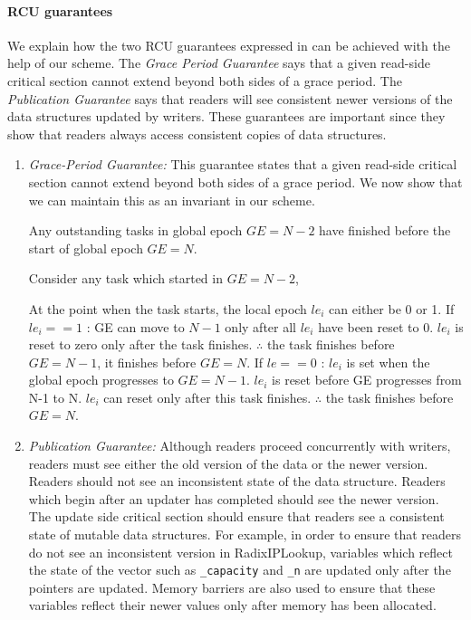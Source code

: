 \documentclass[a4paper]{article}
\newcommand{\INDSTATE}[1][1]{\STATE\hspace{#1\algorithmicindent}}
\begin{document}
\paragraph{RCU guarantees} 
We explain how the two RCU guarantees expressed in \cite{urcu} can be achieved with the help of our scheme. The \emph{Grace Period Guarantee} says that a given read-side critical section cannot extend beyond both sides of a grace period. The \emph{Publication Guarantee} says that readers will see consistent newer versions of the data structures updated by writers. These guarantees are important since they show that readers always access consistent copies of data structures. 
\begin{enumerate}
\item \emph{Grace-Period Guarantee:} This guarantee states that a given read-side critical section cannot extend beyond both sides of a grace period. We now show that we can maintain this as an invariant in our scheme.

\begin{algorithmic}[float=tph]
\STATE Any outstanding tasks in global epoch $GE=N-2$ have finished before the start of global epoch $GE=N$.

\STATE Consider any task which started in $GE = N-2$,

\STATE At the point when the task starts, the local epoch $le_i$ can either be 0 or 1.
\newline
\STATE If $le_i==1$ :
\INDSTATE GE can move to $N-1$ only after all $le_i$ have been reset to 0. 
\INDSTATE $le_i$ is reset to zero only after the task finishes.
\INDSTATE $\therefore$ the task finishes before $GE=N-1$, it finishes before $GE=N$.
\newline
\STATE If $le==0$ :
\INDSTATE $le_i$ is set when the global epoch progresses to $GE = N-1$.
\INDSTATE $le_i$ is reset before GE progresses from N-1 to N.
\INDSTATE $le_i$ can reset only after this task finishes.
\INDSTATE $\therefore$ the task finishes before $GE=N$.
\end{algorithmic}

\item \emph{Publication Guarantee:} 
Although readers proceed concurrently with writers, readers must see either the old version of the data or the newer version. Readers should not see an inconsistent state of the data structure. Readers which begin after an updater has completed should see the newer version. The update side critical section should ensure that readers see a consistent state of mutable data structures. For example, in order to ensure that readers do not see an inconsistent version in RadixIPLookup, variables which reflect the state of the vector such as \verb+_capacity+ and \verb+_n+ are updated only after the pointers are updated. Memory barriers are also used to ensure that these variables reflect their newer values only after memory has been allocated.\\
\end{enumerate}
\end{document}
